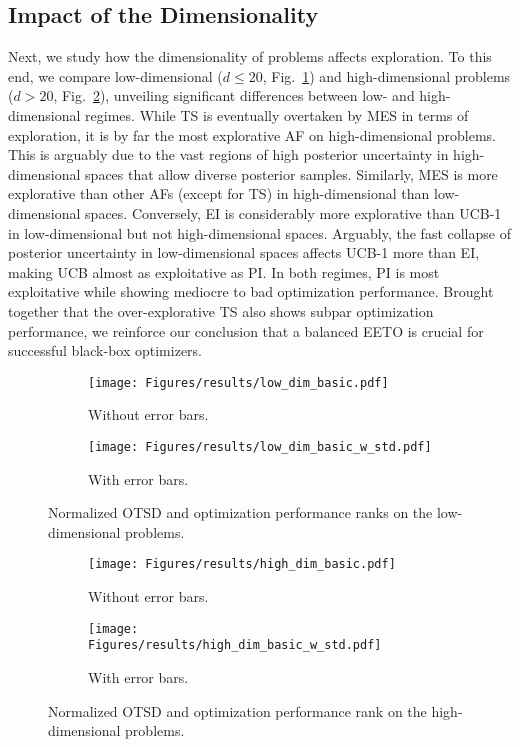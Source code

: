 \documentclass[accepted]{uai2025}
\begin{document}
\subsection{Impact of the Dimensionality}
\label{app:impact-of-dimensionality}
Next, we study how the dimensionality of problems affects exploration.
To this end, we compare low-dimensional ($d\leq 20$, Fig.~\ref{fig:lowdim_benchmarks_basic_af_conf}) and high-dimensional problems ($d> 20$, Fig.~\ref{fig:highdim_benchmarks_basic_af_conf}), unveiling significant differences between low- and high-dimensional regimes.
While \ac{TS} is eventually overtaken by \ac{MES} in terms of exploration, it is by far the most explorative \ac{AF} on high-dimensional problems.
This is arguably due to the vast regions of high posterior uncertainty in high-dimensional spaces that allow diverse posterior samples.
Similarly, \ac{MES} is more explorative than other \acp{AF} (except for \ac{TS}) in high-dimensional than low-dimensional spaces.
Conversely, \ac{EI} is considerably more explorative than \ac{UCB}-1 in low-dimensional but not high-dimensional spaces.
Arguably, the fast collapse of posterior uncertainty in low-dimensional spaces affects \ac{UCB}-1 more than \ac{EI}, making \ac{UCB} almost as exploitative as \ac{PI}.
In both regimes, \ac{PI} is most exploitative while showing mediocre to bad optimization performance.
Brought together that the over-explorative \ac{TS} also shows subpar optimization performance, we reinforce our conclusion that a balanced \ac{EETO} is crucial for successful black-box optimizers.

\begin{figure}[H]
    \centering
    \begin{subfigure}{0.48\linewidth}
    \texttt{[image: Figures/results/low\_dim\_basic.pdf]}
    \caption{Without error bars.}
    \end{subfigure}
    \begin{subfigure}{0.48\linewidth}
    \texttt{[image: Figures/results/low\_dim\_basic\_w\_std.pdf]}
    \caption{With error bars.}
    \end{subfigure}
    \caption{Normalized \ac{OTSD} and optimization performance ranks on the low-dimensional problems. }
    \label{fig:lowdim_benchmarks_basic_af_conf}
\end{figure}

\begin{figure}[H]
    \centering
    \begin{subfigure}{0.48\linewidth}
    \texttt{[image: Figures/results/high\_dim\_basic.pdf]}
    \caption{Without error bars.}
    \end{subfigure}
    \begin{subfigure}{0.48\linewidth}
    \texttt{[image: Figures/results/high\_dim\_basic\_w\_std.pdf]}
    \caption{With error bars.}
    \end{subfigure}
    \caption{Normalized \ac{OTSD} and optimization performance rank on the high-dimensional problems.}
    \label{fig:highdim_benchmarks_basic_af_conf}
\end{figure}
\end{document}
